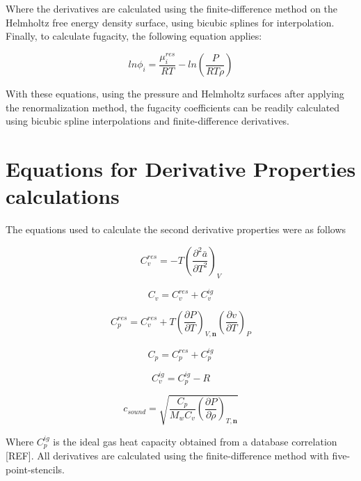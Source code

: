 \documentclass[preprint,12pt,3p]{elsarticle}
\begin{document}
\begin{appendices}
Where the derivatives are calculated using the finite-difference method on the Helmholtz free energy density surface, using bicubic splines for interpolation.
Finally, to calculate fugacity, the following equation applies:

\begin{equation} \label{eq:fugacity}
ln\phi_{i} = \frac{\mu_{i}^{res}}{RT} - ln\left(\frac{P}{RT\rho}\right)
\end{equation}

With these equations, using the pressure and Helmholtz surfaces after applying the renormalization method, the fugacity coefficients can be readily calculated using bicubic spline interpolations and finite-difference derivatives.

\setcounter{equation}{0}
\section{Equations for Derivative Properties calculations}

The equations used to calculate the second derivative properties were as follows

\begin{equation} \label{eq:Cvres_deriv}
C_{v}^{res} = -T\left(\frac{\partial^{2}\bar{a}}{\partial T^{2}}\right)_{V}
\end{equation}

\begin{equation} \label{eq:Cv_deriv}
C_{v} = C_{v}^{res} + C_{v}^{ig}
\end{equation}

\begin{equation} \label{eq:Cpres_deriv}
C_{p}^{res} = C_{v}^{res} + T \left(\frac{\partial P}{\partial T}\right)_{V,\textbf{n}} \left(\frac{\partial v}{\partial T}\right)_{P}
\end{equation}

\begin{equation} \label{eq:Cp_deriv}
C_{p} = C_{p}^{res} + C_{p}^{ig}
\end{equation}

\begin{equation} \label{eq:Cvig_deriv}
C_{v}^{ig} = C_{p}^{ig} - R
\end{equation}

\begin{equation} \label{eq:u_deriv}
c_{sound} = \sqrt{\frac{C_{p}}{M_{w} C_{v}}\left(\frac{\partial P}{\partial \rho}\right)_{T,\textbf{n}}}
\end{equation}

Where $C_{p}^{ig}$ is the ideal gas heat capacity obtained from a database correlation [REF].
All derivatives are calculated using the finite-difference method with five-point-stencils.

\end{appendices}

%

\nocite{*}

\section*{\refname}


\end{document}
